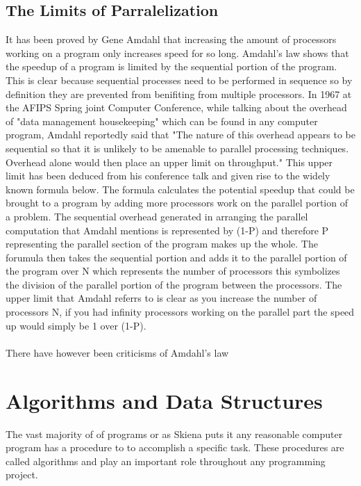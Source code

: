 \documentclass{report}
\begin{document}
\subsection{The Limits of Parralelization}
It has been proved by Gene Amdahl that increasing the amount of processors working on a program only increases speed for so long. Amdahl's law shows that the speedup of a program is limited by the sequential portion of the program. This is clear because sequential processes need to be performed in sequence so by definition they are prevented from benifiting from multiple processors. In 1967 at the AFIPS Spring joint Computer Conference, while talking about the overhead of "data management housekeeping" which can be found in any computer program, Amdahl reportedly said that "The nature of this overhead appears to be sequential so that it is unlikely to be amenable to parallel processing techniques. Overhead alone would then place an upper limit on throughput."\cite{Amdahl1967} This upper limit has been deduced from his conference talk and given rise to the widely known formula below.
The formula calculates the potential speedup that could be brought to a program by adding more processors work on the parallel portion of a problem. The sequential overhead generated in arranging the parallel computation that Amdahl mentions is represented by (1-P) and therefore P representing the parallel section of the program makes up the whole. The forumula then takes the sequential portion and adds it to the parallel portion of the program over N which represents the number of processors this symbolizes the division of the parallel portion of the program between the processors. The upper limit that Amdahl referrs to is clear as you increase the number of processors N, if you had infinity processors working on the parallel part the speed up would simply be 1 over (1-P).
\cite{Amdahl1967}

\paragraph{}
There have however been criticisms of Amdahl's law

\section{Algorithms and Data Structures}
\cite{Skiena2010}
The vast majority of of programs or as Skiena puts it any reasonable computer program has a procedure to to accomplish a specific task. These procedures are called algorithms and play an important role throughout any programming project. 
\end{document}
